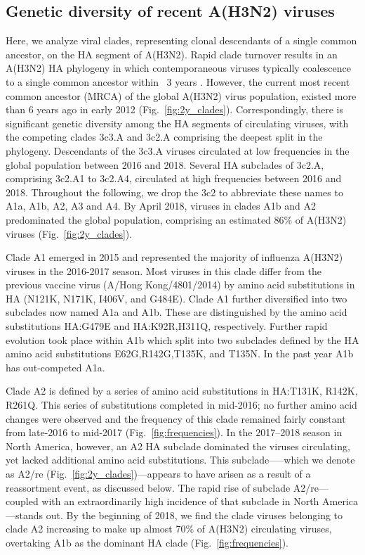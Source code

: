 \subsection*{Genetic diversity of recent A(H3N2) viruses}
Here, we analyze viral clades, representing clonal descendants of a single common ancestor, on the HA segment of A(H3N2).
Rapid clade turnover results in an A(H3N2) HA phylogeny in which contemporaneous viruses typically coalescence to a single common ancestor within ~3 years \citep{bedford_global_2015}.
However, the current most recent common ancestor (MRCA) of the global A(H3N2) virus population, existed more than 6 years ago in early 2012 (Fig.~\ref{fig:2y_clades}).
Correspondingly, there is significant genetic diversity among the HA segments of circulating viruses, with the competing clades 3c3.A and 3c2.A comprising the deepest split in the phylogeny.
Descendants of the 3c3.A viruses circulated at low frequencies in the global population between 2016 and 2018.
Several HA subclades of 3c2.A, comprising 3c2.A1 to 3c2.A4, circulated at high frequencies between 2016 and 2018.
Throughout the following, we drop the 3c2 to abbreviate these names to A1a, A1b, A2, A3 and A4.
By April 2018, viruses in clades A1b and A2 predominated the global population, comprising an estimated 86\% of A(H3N2) viruses (Fig.~\ref{fig:2y_clades}).

Clade A1 emerged in 2015 and represented the majority of influenza A(H3N2) viruses in the 2016-2017 season.
Most viruses in this clade differ from the previous vaccine virus (A/Hong Kong/4801/2014) by amino acid substitutions in HA (N121K, N171K, I406V, and G484E).
Clade A1 further diversified into two subclades now named A1a and A1b.
These are distinguished by the amino acid substitutions HA:G479E and HA:K92R,H311Q, respectively.
Further rapid evolution took place within A1b which split into two subclades defined by the HA amino acid substitutions E62G,R142G,T135K, and T135N.
In the past year A1b has out-competed A1a.

Clade A2 is defined by a series of amino acid substitutions in HA:T131K, R142K, R261Q.
This series of substitutions completed in mid-2016; no further amino acid changes were observed and the frequency of this clade remained fairly constant from late-2016 to mid-2017 (Fig.~\ref{fig:frequencies}).
In the 2017--2018 season in North America, however, an A2 HA subclade dominated the viruses circulating, yet lacked additional amino acid substitutions.
This subclade—--which we denote as A2/re (Fig.~\ref{fig:2y_clades})---appears to have arisen as a result of a reassortment event, as discussed below.
The rapid rise of subclade A2/re---coupled with an extraordinarily high incidence of that subclade in North America---stands out.
By the beginning of 2018, we find the clade viruses belonging to clade A2 increasing to make up almost 70\% of A(H3N2) circulating viruses, overtaking A1b as the dominant HA clade (Fig.~\ref{fig:frequencies}).

